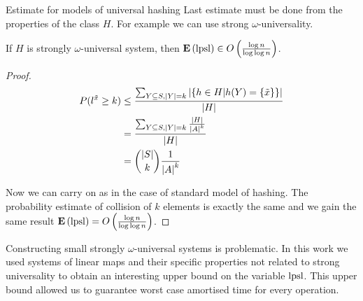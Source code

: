 \begin{section}{Estimate for models of universal hashing}
Last estimate must be done from the properties of the class $H$. For example we can use strong $\omega$-universality.

\begin{theorem}
If $H$ is strongly $\omega$-universal system, then $\mathbf{E}\left(\mathrm{lpsl}\right) \in O\left(\frac{\log n}{\log \log n}\right)$.
\end{theorem}
\begin{proof}
\begin{displaymath}
\begin{split}
P(l^{\tilde{x}} \geq k) 
	& \leq \frac{\sum\displaylimits_{Y \subseteq S, |Y| = k} | \{ h \in H | h(Y) = \{\tilde{x}\} \}|}{|H|} \\
	& = \frac{\sum\displaylimits_{Y \subseteq S, |Y| = k} \frac{|H|}{{|A|}^{k}}}{|H|} \\
	& = \dbinom{|S|}{k}\frac{1}{{|A|}^k}
\end{split}
\end{displaymath}

Now we can carry on as in the case of standard model of hashing. The probability estimate of collision of $k$ elements is exactly the same and we gain the same result $\mathbf{E}\left(\mathrm{lpsl}\right) = O\left(\frac{\log n}{\log \log n}\right)$.
\end{proof}

Constructing small strongly $\omega$-universal systems is problematic. In this work we used systems of linear maps and their specific properties not related to strong universality to obtain an interesting upper bound on the variable $\mathrm{lpsl}$. This upper bound allowed us to guarantee worst case amortised time for every operation.
\end{section}
